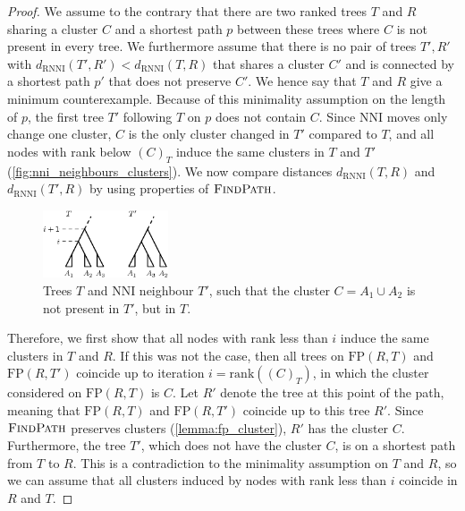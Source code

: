 \documentclass[11pt]{amsart}
\newcommand{\rnni}{\mathrm{RNNI}}
\newcommand{\findpath}{\textsc{FindPath}}
\newcommand{\rank}{\mathrm{rank}}
\newcommand{\nni}{\mathrm{NNI}}
\newcommand{\fp}{\mathrm{FP}}
\begin{document}
\begin{proof}
	We assume to the contrary that there are two ranked trees $T$ and $R$ sharing a cluster $C$ and a shortest path $p$ between these trees where $C$ is not present in every tree.
	We furthermore assume that there is no pair of trees $T',R'$ with $d_{\rnni}(T',R') < d_{\rnni}(T,R)$ that shares a cluster $C'$ and is connected by a shortest path $p'$ that does not preserve $C'$.
	We hence say that $T$ and $R$ give a minimum counterexample.
	Because of this minimality assumption on the length of $p$, the first tree $T'$ following $T$ on $p$ does not contain $C$.
	Since $\nni$ moves only change one cluster, $C$ is the only cluster changed in $T'$ compared to $T$, and all nodes with rank below $(C)_T$ induce the same clusters in $T$ and $T'$ (\autoref{fig:nni_neighbours_clusters}).
	We now compare distances $d_{\rnni}(T,R)$ and $d_{\rnni}(T',R)$ by using properties of $\findpath$.

	\begin{figure}[ht]
		\includegraphics[width=0.33\textwidth]{nni_neighbours_clusters.eps}
		\caption{Trees $T$ and $\nni$ neighbour $T'$, such that the cluster $C = A_1 \cup A_2$ is not present in $T'$, but in $T$.}
		\label{fig:nni_neighbours_clusters}
	\end{figure}

	Therefore, we first show that all nodes with rank less than $i$ induce the same clusters in $T$ and $R$.
	If this was not the case, then all trees on $\fp(R,T)$ and $\fp(R,T')$ coincide up to iteration $i = \rank((C)_T)$, in which the cluster considered on $\fp(R,T)$ is $C$.
	Let $R'$ denote the tree at this point of the path, meaning that $\fp(R,T)$ and $\fp(R,T')$ coincide up to this tree $R'$.
	Since $\findpath$ preserves clusters (\autoref{lemma:fp_cluster}), $R'$ has the cluster $C$.
	Furthermore, the tree $T'$, which does not have the cluster $C$, is on a shortest path from $T$ to $R$.
	This is a contradiction to the minimality assumption on $T$ and $R$, so we can assume that all clusters induced by nodes with rank less than $i$ coincide in $R$ and $T$.


\end{proof}
\end{document}
